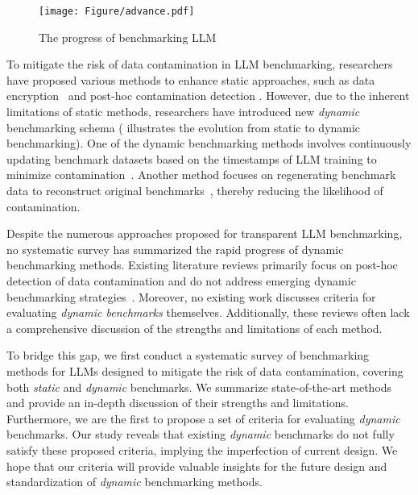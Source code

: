 \begin{figure}
    \centering
    \texttt{[image: Figure/advance.pdf]}
    \caption{The progress of benchmarking LLM}
    \label{fig:transition}
\end{figure}


To mitigate the risk of data contamination in LLM benchmarking, researchers have proposed various methods to enhance static approaches, such as data encryption~\cite{jacovi-etal-2023-stop} and post-hoc contamination detection \cite{shidetecting}. However, due to the inherent limitations of static methods, researchers have introduced new \textit{dynamic} benchmarking schema ( illustrates the evolution from static to dynamic benchmarking). 
One of the dynamic benchmarking methods involves continuously updating benchmark datasets based on the timestamps of LLM training to minimize contamination~\cite{white2024livebench, jain2024livecodebenchholisticcontaminationfree}. Another method focuses on regenerating benchmark data to reconstruct original benchmarks~\cite{chen2024ppm, zhou2025gsm, mirzadeh2025gsmsymbolic}, thereby reducing the likelihood of contamination.  


Despite the numerous approaches proposed for transparent LLM benchmarking, no systematic survey has summarized the rapid progress of dynamic benchmarking methods. Existing literature reviews primarily focus on post-hoc detection of data contamination and do not address emerging dynamic benchmarking strategies~\cite{deng2024unveiling, ravaut2024much}. Moreover, no existing work discusses criteria for evaluating \textit{dynamic benchmarks} themselves. Additionally, these reviews often lack a comprehensive discussion of the strengths and limitations of each method.




To bridge this gap, we first conduct a systematic survey of benchmarking methods for LLMs designed to mitigate the risk of data contamination, covering both \textit{static} and \textit{dynamic} benchmarks. We summarize state-of-the-art methods and provide an in-depth discussion of their strengths and limitations.   Furthermore, we are the first to propose a set of criteria for evaluating \textit{dynamic} benchmarks. Our study reveals that existing \textit{dynamic} benchmarks do not fully satisfy these proposed criteria, implying the imperfection of current design. We hope that our criteria will provide valuable insights for the future design and standardization of \textit{dynamic} benchmarking methods.

